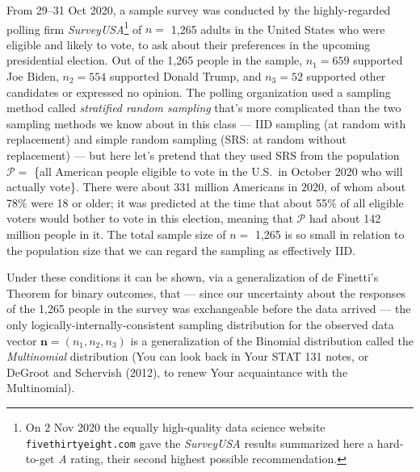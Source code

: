 \documentclass[12pt]{article}
\begin{document}
\textit{} \vspace*{0.025in} From 29--31 Oct 2020, a sample survey was conducted by the highly-regarded polling firm \textit{SurveyUSA}\footnote{On 2 Nov 2020 the equally high-quality data science website \texttt{fivethirtyeight.com} gave the \textit{SurveyUSA} results summarized here a hard-to-get \textit{A} rating, their second highest possible recommendation.} of $n =$ 1,265 adults in the United States who were eligible and likely to vote, to ask about their preferences in the upcoming presidential election. Out of the 1,265 people in the sample, $n_1 = 659$ supported Joe Biden, $n_2 = 554$ supported Donald Trump, and $n_3 = 52$ supported other candidates or expressed no opinion. The polling organization used a sampling method called \textit{stratified random sampling} that's more complicated than the two sampling methods we know about in this class --- IID sampling (at random with replacement) and simple random sampling (SRS: at random without replacement) --- but here let's pretend that they used SRS from the population $\mathcal{ P } =$ \{all American people eligible to vote in the U.S.~in October 2020 who will actually vote\}. There were about 331 million Americans in 2020, of whom about 78\% were 18 or older; it was predicted at the time that about 55\% of all eligible voters would bother to vote in this election, meaning that $\mathcal{ P }$ had about 
142 million people in it. The total sample size of $n =$ 1,265 is so small in relation to the population size that we can regard the sampling as effectively IID.

Under these conditions it can be shown, via a generalization of de Finetti's Theorem for binary outcomes, that --- since our uncertainty about the responses of the 1,265 people in the survey was exchangeable before the data arrived --- the only logically-internally-consistent sampling distribution for the observed  data vector $\bm{ n } = ( n_1, n_2, n_3 )$ is a generalization of the Binomial distribution called the \textit{Multinomial} distribution (You can look back in Your STAT 131 notes, or DeGroot and Schervish (2012), to renew Your acquaintance with the Multinomial). 
\end{document}
